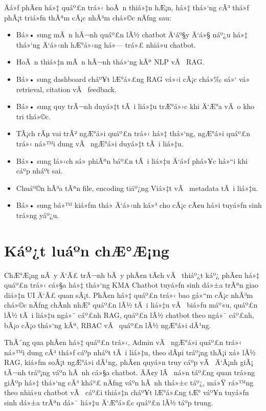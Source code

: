 ﻿\documentclass[12pt,a4paper]{report}
\begin{document}
Äá»ƒ phÃ¢n há»‡ quáº£n trá»‹ hoÃ n thiá»‡n hÆ¡n, há»‡ thá»‘ng cÃ³ thá»ƒ phÃ¡t triá»ƒn thÃªm cÃ¡c nhÃ³m chá»©c nÄƒng sau:

\begin{itemize}
    \item Bá»• sung mÃ n hÃ¬nh quáº£n lÃ½ chatbot Ä‘áº§y Ä‘á»§ náº¿u há»‡ thá»‘ng Ä‘á»‹nh hÆ°á»›ng há»— trá»£ nhiá»u chatbot.
    \item HoÃ n thiá»‡n mÃ n hÃ¬nh thá»‘ng kÃª NLP vÃ  RAG.
    \item Bá»• sung dashboard cháº¥t lÆ°á»£ng RAG vá»›i cÃ¡c chá»‰ sá»‘ vá» retrieval, citation vÃ  feedback.
    \item Bá»• sung quy trÃ¬nh duyá»‡t tÃ i liá»‡u trÆ°á»›c khi Ä‘Æ°a vÃ o kho tri thá»©c.
    \item TÃ¡ch rÃµ vai trÃ² ngÆ°á»i quáº£n trá»‹ há»‡ thá»‘ng, ngÆ°á»i quáº£n trá»‹ ná»™i dung vÃ  ngÆ°á»i duyá»‡t tÃ i liá»‡u.
    \item Bá»• sung lá»‹ch sá»­ phiÃªn báº£n tÃ i liá»‡u Ä‘á»ƒ phá»¥c há»“i khi cáº­p nháº­t sai.
    \item Chuáº©n hÃ³a tÃªn file, encoding tiáº¿ng Viá»‡t vÃ  metadata tÃ i liá»‡u.
    \item Bá»• sung bá»™ kiá»ƒm thá»­ Ä‘á»‹nh ká»³ cho cÃ¡c cÃ¢u há»i tuyá»ƒn sinh trá»ng yáº¿u.
\end{itemize}

\section{Káº¿t luáº­n chÆ°Æ¡ng}

ChÆ°Æ¡ng nÃ y Ä‘Ã£ trÃ¬nh bÃ y phÃ¢n tÃ­ch vÃ  thiáº¿t káº¿ phÃ¢n há»‡ quáº£n trá»‹ cá»§a há»‡ thá»‘ng KMA Chatbot tuyá»ƒn sinh dá»±a trÃªn giao diá»‡n UI Ä‘Ã£ quan sÃ¡t. PhÃ¢n há»‡ quáº£n trá»‹ bao gá»“m cÃ¡c nhÃ³m chá»©c nÄƒng chÃ­nh nhÆ° quáº£n lÃ½ tÃ i liá»‡u vÃ  biá»ƒu máº«u, quáº£n lÃ½ tÃ i liá»‡u ngá»¯ cáº£nh RAG, quáº£n lÃ½ chatbot theo ngá»¯ cáº£nh, bÃ¡o cÃ¡o thá»‘ng kÃª, RBAC vÃ  quáº£n lÃ½ ngÆ°á»i dÃ¹ng.

ThÃ´ng qua phÃ¢n há»‡ quáº£n trá»‹, Admin vÃ  ngÆ°á»i quáº£n trá»‹ ná»™i dung cÃ³ thá»ƒ cáº­p nháº­t tÃ i liá»‡u, theo dÃµi tráº¡ng thÃ¡i xá»­ lÃ½ RAG, kiá»ƒm soÃ¡t ngÆ°á»i dÃ¹ng, phÃ¢n quyá»n truy cáº­p vÃ  Ä‘Ã¡nh giÃ¡ tÃ¬nh tráº¡ng váº­n hÃ nh cá»§a chatbot. ÄÃ¢y lÃ  ná»n táº£ng quan trá»ng giÃºp há»‡ thá»‘ng cÃ³ kháº£ nÄƒng váº­n hÃ nh thá»±c táº¿, má»Ÿ rá»™ng theo nhiá»u chatbot vÃ  cáº£i thiá»‡n cháº¥t lÆ°á»£ng tÆ° váº¥n tuyá»ƒn sinh dá»±a trÃªn dá»¯ liá»‡u Ä‘Æ°á»£c quáº£n lÃ½ táº­p trung.
\end{document}
